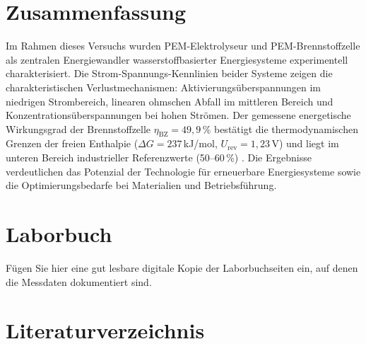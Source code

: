 \documentclass[11pt,a4paper]{article}
\numberwithin{equation}{section}
\begin{document}
\section{Zusammenfassung}

Im Rahmen dieses Versuchs wurden PEM-Elektrolyseur und PEM-Brennstoffzelle als zentralen Energiewandler wasserstoffbasierter Energiesysteme experimentell charakterisiert. Die Strom-Spannungs-Kennlinien beider Systeme zeigen die charakteristischen Verlustmechanismen: Aktivierungsüberspannungen im niedrigen Strombereich, linearen ohmschen Abfall im mittleren Bereich und Konzentrationsüberspannungen bei hohen Strömen.
\newline Der gemessene energetische Wirkungsgrad der Brennstoffzelle $\eta_\text{BZ} = 49{,}9\,\%$ bestätigt die thermodynamischen Grenzen der freien Enthalpie ($\Delta G = 237$\,kJ/mol, $U_\text{rev} = 1{,}23$\,V) und liegt im unteren Bereich industrieller Referenzwerte (50--60\,\%) \cite{4}. Die Ergebnisse verdeutlichen das Potenzial der Technologie für erneuerbare Energiesysteme sowie die Optimierungsbedarfe bei Materialien und Betriebsführung.

\newpage
\appendix
\section{Laborbuch}

Fügen Sie hier eine gut lesbare digitale Kopie der Laborbuchseiten ein, auf denen die Messdaten dokumentiert sind.

\section{Literaturverzeichnis}
\end{document}
